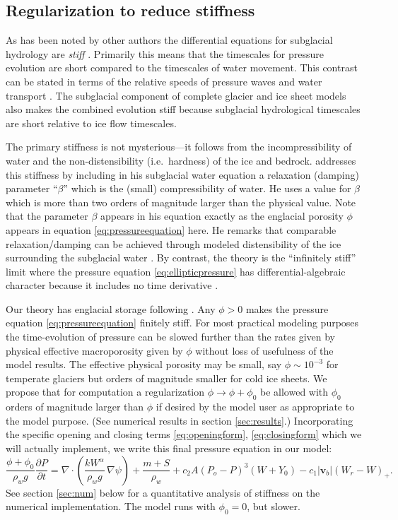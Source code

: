 \documentclass[11pt,final]{amsart}
\newcommand\bv{\mathbf{v}}
\newcommand{\Div}{\nabla\cdot}
\newcommand{\grad}{\nabla}
\begin{document}
\subsection*{Regularization to reduce stiffness}  As has been noted by other authors \citep{Clarke2003,Schoofetal2012} the differential equations for subglacial hydrology are \emph{stiff} \citep{AscherPetzold}.  Primarily  this means that the timescales for pressure evolution are short compared to the timescales of water movement.  This contrast can be stated in terms of the relative speeds of pressure waves and water transport \citep[Appendix A]{Clarke2003}.  The subglacial component of complete glacier and ice sheet models also makes the combined evolution stiff because subglacial hydrological timescales are short relative to ice flow timescales.

The primary stiffness is not mysterious---it follows from the incompressibility of water and the non-distensibility (i.e.~hardness) of the ice and bedrock.  \cite{Clarke2003} addresses this stiffness by including in his subglacial water equation a relaxation (damping) parameter  ``$\beta$'' which is the (small) compressibility of water.  He uses a value for $\beta$ which is more than two orders of magnitude larger than the physical value.  Note that the parameter $\beta$ appears in his equation exactly as the englacial porosity $\phi$ appears in equation \eqref{eq:pressureequation} here.  He remarks that comparable relaxation/damping can be achieved through modeled distensibility of the ice surrounding the subglacial water \citep[Appendix A]{Clarke2003}.  By contrast, the \cite{Schoofetal2012} theory is the ``infinitely stiff'' limit where the pressure equation \eqref{eq:ellipticpressure} has differential-algebraic character because it includes no time derivative \citep{AscherPetzold}.

Our theory has englacial storage following \cite{Bartholomausetal2011}.  Any $\phi>0$ makes the pressure equation  \eqref{eq:pressureequation} finitely stiff.  For most practical modeling purposes the time-evolution of pressure can be slowed further than the rates given by physical effective macroporosity given by $\phi$ without loss of usefulness of the model results.  The effective physical porosity may be small, say $\phi\sim 10^{-3}$ for temperate glaciers but orders of magnitude smaller for cold ice sheets.  We propose that for computation a regularization $\phi \to \phi+\phi_0$ be allowed with $\phi_0$ orders of magnitude larger than $\phi$ if desired by the model user as appropriate to the model purpose.  (See numerical results in section \ref{sec:results}.)  Incorporating the specific opening and closing terms \eqref{eq:openingform}, \eqref{eq:closingform} which we will actually implement, we write this final pressure equation in our model:
\begin{equation}
\frac{\phi+\phi_0}{\rho_w g} \frac{\partial P}{\partial t} = \Div \left(\frac{k W^\alpha}{\rho_w g}\, \grad \psi \right) + \frac{m+S}{\rho_w} + c_2 A (P_o - P)^3 (W+Y_0) - c_1 |\bv_b| (W_r - W)_+. \label{eq:regpressureequation}
\end{equation}
See section \ref{sec:num} below for a quantitative analysis of stiffness on the numerical implementation.  The model runs with $\phi_0=0$, but slower.
\end{document}
